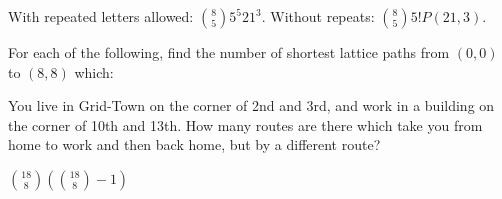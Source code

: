 \begin{questions}
	\begin{answer}
		 With repeated letters allowed: ${8 \choose 5}5^5 21^3$.  Without repeats: ${8 \choose 5}5! P(21, 3)$.
	\end{answer}




\question For each of the following, find the number of shortest lattice paths from $(0,0)$ to $(8,8)$ which:

	\begin{answer}
	\end{answer}




\question You live in Grid-Town on the corner of 2nd and 3rd, and work in a building on the corner of 10th and 13th.  How many routes are there which take you from home to work and then back home, but by a different route?

	\begin{answer}
		 ${18 \choose 8}\left({18 \choose 8} - 1\right)$
	\end{answer}





\end{questions}
